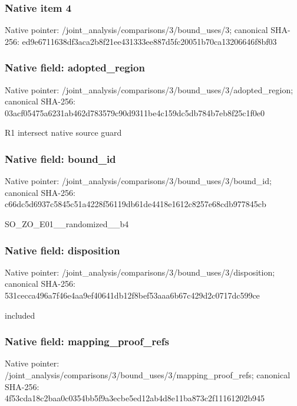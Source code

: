 \documentclass[10pt,a4paper]{article}
\begin{document}
\subsubsection{Native item 4}
Native pointer: /joint\_\allowbreak{}analysis/comparisons/3/bound\_\allowbreak{}uses/3; canonical SHA-256: ed9e6711638df3aca2b8f21ee431333ee887d5fc20051b70ca13206646f8bf03

\subsubsection{Native field: adopted\_\allowbreak{}region}
Native pointer: /joint\_\allowbreak{}analysis/comparisons/3/bound\_\allowbreak{}uses/3/adopted\_\allowbreak{}region; canonical SHA-256: 03acf05475a6231ab462d783579c90d9311be4c159dc5db784b7eb8f25c1f0e0

\begingroup\raggedright\sloppy R1 intersect native source guard\par\endgroup

\subsubsection{Native field: bound\_\allowbreak{}id}
Native pointer: /joint\_\allowbreak{}analysis/comparisons/3/bound\_\allowbreak{}uses/3/bound\_\allowbreak{}id; canonical SHA-256: c66dc5d6937c5845c51a4228f56119db61de4418e1612c8257e68cdb977845cb

\begingroup\raggedright\sloppy SO\_\allowbreak{}ZO\_\allowbreak{}E01\_\allowbreak{}\_\allowbreak{}randomized\_\allowbreak{}\_\allowbreak{}b4\par\endgroup

\subsubsection{Native field: disposition}
Native pointer: /joint\_\allowbreak{}analysis/comparisons/3/bound\_\allowbreak{}uses/3/disposition; canonical SHA-256: 531cecca496a7f46e4aa9ef40641db12f8bef53aaa6b67c429d2c0717dc599ce

\begingroup\raggedright\sloppy included\par\endgroup

\subsubsection{Native field: mapping\_\allowbreak{}proof\_\allowbreak{}refs}
Native pointer: /joint\_\allowbreak{}analysis/comparisons/3/bound\_\allowbreak{}uses/3/mapping\_\allowbreak{}proof\_\allowbreak{}refs; canonical SHA-256: 4f53cda18c2baa0c0354bb5f9a3ecbe5ed12ab4d8e11ba873c2f11161202b945
\end{document}

